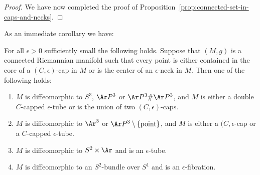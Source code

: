 \begin{proof}
We have now completed the proof of Proposition~\ref{prop:connected-set-in-caps-and-necks}.
\end{proof}


As an immediate corollary we have:


\begin{proposition}
\label{prop:classification-covered-by-necks-caps}
\label{epstopology}
For all $\epsilon>0$ sufficiently small the following holds. Suppose
that $(M,g)$ is a connected Riemannian manifold such that every
point is either contained in the core of a $(C,\epsilon)$-cap in $M$
or is the center of an $\epsilon$-neck in $M$. Then one of the
following holds:
\begin{enumerate}
\item[(1)] $M$ is diffeomorphic to $S^3$, $\Ar P^3$ or $\Ar P^3\#\Ar
P^3$,
and $M$ is either a double $C$-capped $\epsilon$-tube or is the
union of two $(C,\epsilon)$-caps.
\item[(2)] $M$ is diffeomorphic to  $\Ar^3$ or $\Ar P^3\setminus \{\mathrm{point}\}$,
and $M$ is either a $(C,\epsilon$-cap or a $C$-capped
$\epsilon$-tube.
\item[(3)] $M$ is diffeomorphic to $S^2\times \Ar$ and is an
$\epsilon$-tube.
\item[(4)] $M$ is diffeomorphic to an $S^2$-bundle over $S^1$ and is an $\epsilon$-fibration.
\end{enumerate}
\end{proposition}
